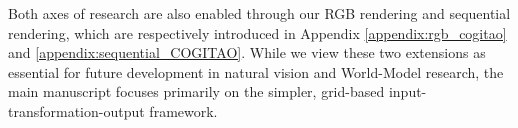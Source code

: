 Both axes of research are also enabled through our RGB rendering and sequential rendering, which are respectively introduced in Appendix \ref{appendix:rgb_cogitao} and \ref{appendix:sequential_COGITAO}. While we view these two extensions as essential for future development in natural vision and World-Model research, the main manuscript focuses primarily on the simpler, grid-based input-transformation-output framework.